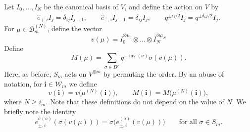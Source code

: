 \documentclass[11pt]{article}
\numberwithin{equation}{section}
\numberwithin{equation}{section}
\DeclareMathOperator{\inv}{inv}
\newcommand{\zz}{{\mu}}
\newcommand{\ii}{{\mathbf{i}}}
\newcommand{\zo}{{(\mu)}}
\begin{document}
Let $ I_0,\dots,I_N $ be the canonical basis of $ V $, and define the action on $ V $ by 	
\begin{gather}
\hat{e}_{+,i}I_j=\delta_{ij}I_{j-1},\qquad
\hat{e}_{-,i}I_{j-1}=\delta_{ij}I_j,\qquad
q^{\pm \epsilon_i/2}I_j=q^{\pm \delta_ij/2}I_j.\label{21}
\end{gather}
For $\mu \in \mathcal{B}_m^{(N)}$, define the vector
\begin{equation*}%
v\zo =I_0^{\otimes \mu_0} \otimes \dots \otimes I_N^{\otimes \mu_N}
\end{equation*}
Define
\begin{equation*}
M(\zz) = \sum_{\sigma \in D^{\mu}}q^{-\inv (\sigma)} \sigma (v(\mu)).
\end{equation*}
Here, as before, $S_m $ acts on $ V^{\otimes m} $ by permuting the order.
By an abuse of notation, for $\ii \in \mathcal{W}_m$ we define
\[
v(\ii) = v\big(\mu^{(N)}(\ii)\big), \qquad M(\ii) = M\big(\mu^{(N)}(\ii)\big),
\]
where $N \geq i_m$. Note that these definitions do not depend on the value of $N$.
We briefly note the identity
\begin{equation}\label{Brief}
e^{\sigma(a)}_{\pm,i} ( \sigma(v(\mu)) ) = \sigma\big( e^{(a)}_{\pm,i} ( v(\mu) ) \big) \qquad \text{for all } \sigma \in S_m.
\end{equation}
\end{document}
